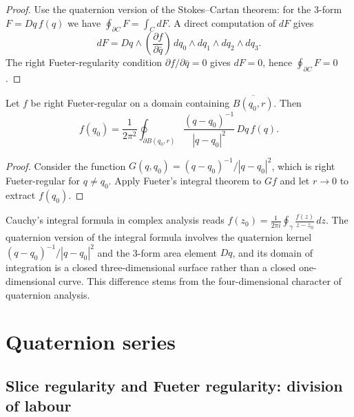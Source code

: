 \begin{proof}
Use the quaternion version of the Stokes--Cartan theorem: for the 3-form $F=Dq\,f(q)$ we have $\oint_{\partial C}F=\int_C dF$. A direct computation of $dF$ gives
\[
dF=Dq\wedge\left(\frac{\partial f}{\partial \bar q}\right)\,dq_0\wedge dq_1\wedge dq_2\wedge dq_3.
\]
The right Fueter-regularity condition $\partial f/\partial \bar q=0$ gives $dF=0$, hence $\oint_{\partial C}F=0$.
\end{proof}

\begin{corollary}\label{cor:q_cauchy_formula}
Let $f$ be right Fueter-regular on a domain containing $\overline{B(q_0,r)}$. Then
\[
f(q_0)=\frac{1}{2\pi^2}\oint_{\partial B(q_0,r)} \frac{(q-q_0)^{-1}}{|q-q_0|^2}\,Dq\,f(q).
\]
\end{corollary}

\begin{proof}
Consider the function $G(q,q_0)=(q-q_0)^{-1}/|q-q_0|^2$, which is right Fueter-regular for $q\neq q_0$. Apply Fueter's integral theorem to $G f$ and let $r\to 0$ to extract $f(q_0)$.
\end{proof}

\begin{remark}\label{rem:q_cauchy_vs_complex}
Cauchy's integral formula in complex analysis reads $f(z_0)=\frac{1}{2\pi i}\oint_\gamma \frac{f(z)}{z-z_0}\,dz$. The quaternion version of the integral formula involves the quaternion kernel $(q-q_0)^{-1}/|q-q_0|^2$ and the 3-form area element $Dq$, and its domain of integration is a closed three-dimensional surface rather than a closed one-dimensional curve. This difference stems from the four-dimensional character of quaternion analysis.
\end{remark}

\section{Quaternion series}

\subsection{Slice regularity and Fueter regularity: division of labour}\label{sec:q_slice_vs_fueter}

